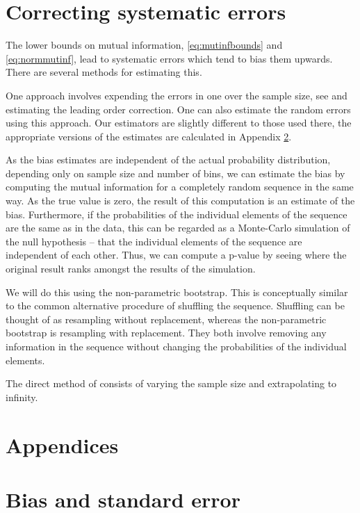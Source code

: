 \documentclass[12pt]{article}
\begin{document}
\section{Correcting systematic errors}\label{sec:syscorr}

The lower bounds on mutual information, \eqref{eq:mutinfbounds} and \eqref{eq:normmutinf}, lead to systematic errors which tend to bias them upwards. There are several methods for estimating this. 

One approach involves expending the errors in one over the sample size, see \cite{1999PhyD..125..285R} and estimating the leading order correction. One can also estimate the random errors using this approach. Our estimators are slightly different to those used there, the appropriate versions of the estimates are calculated in Appendix \ref{sec:stderr}.

As the bias estimates are independent of the actual probability distribution, depending only on sample size and number of bins, we can estimate the bias by computing the mutual information for a completely random sequence in the same way. As the true value is zero, the result of this computation is an estimate of the bias. Furthermore, if the probabilities of the individual elements of the sequence are the same as in the data, this can be regarded as a Monte-Carlo simulation of the null hypothesis -- that the individual elements of the sequence are independent of each other. Thus, we can compute a p-value by seeing where the original result ranks amongst the results of the simulation.

We will do this using the non-parametric bootstrap. This is conceptually similar to the common alternative procedure of shuffling the sequence. Shuffling can be thought of as resampling without replacement, whereas the non-parametric bootstrap is resampling with replacement. They both involve removing any information in the sequence without changing the probabilities of the individual elements.

The direct method of \cite{1998PhRvL..80..197S} consists of varying the sample size and extrapolating to infinity.


\appendix\section*{Appendices}

\section{Bias and standard error}\label{sec:stderr}
\end{document}
